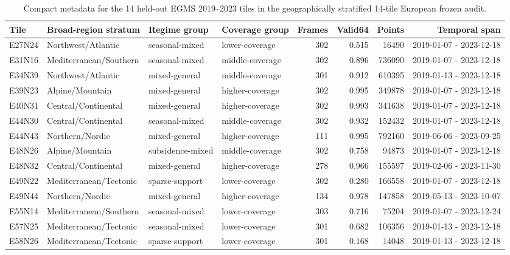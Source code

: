 \documentclass[lettersize,journal]{IEEEtran}
\begin{document}
\begin{table}[!t]
\centering
\scriptsize
\begin{adjustbox}{max width=\textwidth}
\begin{tabular}{llllrrrr}
\toprule
Tile & Broad-region stratum & Regime group & Coverage group & Frames & Valid64 & Points & Temporal span \\
\midrule
E27N24 & Northwest/Atlantic & seasonal-mixed & lower-coverage & 302 & 0.515 & 16490 & 2019-01-07 - 2023-12-18 \\
E31N16 & Mediterranean/Southern & seasonal-mixed & middle-coverage & 302 & 0.896 & 736090 & 2019-01-07 - 2023-12-18 \\
E34N39 & Northwest/Atlantic & mixed-general & middle-coverage & 301 & 0.912 & 610395 & 2019-01-13 - 2023-12-18 \\
E39N23 & Alpine/Mountain & mixed-general & higher-coverage & 302 & 0.995 & 349878 & 2019-01-07 - 2023-12-18 \\
E40N31 & Central/Continental & mixed-general & higher-coverage & 302 & 0.993 & 341638 & 2019-01-07 - 2023-12-18 \\
E44N30 & Central/Continental & seasonal-mixed & middle-coverage & 302 & 0.932 & 152432 & 2019-01-07 - 2023-12-18 \\
E44N43 & Northern/Nordic & mixed-general & higher-coverage & 111 & 0.995 & 792160 & 2019-06-06 - 2023-09-25 \\
E48N26 & Alpine/Mountain & subsidence-mixed & middle-coverage & 302 & 0.758 & 94873 & 2019-01-07 - 2023-12-18 \\
E48N32 & Central/Continental & mixed-general & higher-coverage & 278 & 0.966 & 155597 & 2019-02-06 - 2023-11-30 \\
E49N22 & Mediterranean/Tectonic & sparse-support & lower-coverage & 302 & 0.280 & 166558 & 2019-01-07 - 2023-12-18 \\
E49N44 & Northern/Nordic & mixed-general & higher-coverage & 134 & 0.978 & 147858 & 2019-05-13 - 2023-10-07 \\
E55N14 & Mediterranean/Southern & seasonal-mixed & lower-coverage & 303 & 0.716 & 75204 & 2019-01-07 - 2023-12-24 \\
E57N25 & Mediterranean/Tectonic & seasonal-mixed & lower-coverage & 301 & 0.682 & 106356 & 2019-01-13 - 2023-12-18 \\
E58N26 & Mediterranean/Tectonic & sparse-support & lower-coverage & 301 & 0.168 & 14048 & 2019-01-13 - 2023-12-18 \\
\bottomrule
\end{tabular}
\end{adjustbox}
\caption{Compact metadata for the 14 held-out EGMS 2019--2023 tiles in the geographically stratified 14-tile European frozen audit.}
\label{tab:e7_metadata_compact}
\end{table}
\end{document}
